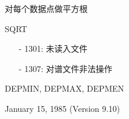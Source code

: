 \label{cmd:sqrt}

对每个数据点做平方根

SQRT

\begin{itemize}
\item[-]1301: 未读入文件
\item[-]1307: 对谱文件非法操作
\end{itemize}

DEPMIN, DEPMAX, DEPMEN

January 15, 1985 (Version 9.10)
